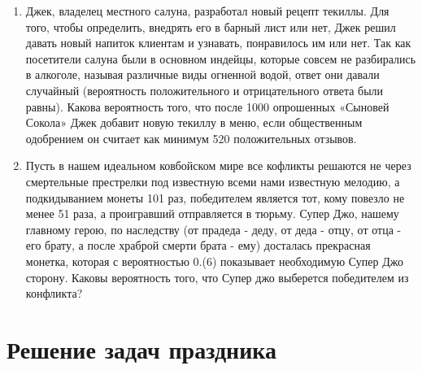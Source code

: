 \documentclass[11pt, a4paper]{article}
\theoremstyle{definition}
\begin{document}
\begin{enumerate}
\begin{enumerate}
    
    \item Джек, владелец местного салуна, разработал новый рецепт текиллы. Для того, чтобы определить, внедрять его в барный лист или нет, Джек решил давать новый напиток клиентам и узнавать, понравилось им или нет. Так как посетители салуна были в основном индейцы, которые совсем не разбирались в алкоголе, называя различные виды огненной водой, ответ они давали случайный (вероятность положительного и отрицательного ответа были равны). Какова вероятность того, что после 1000 опрошенных «Сыновей Сокола» Джек добавит новую текиллу в меню, если общественным одобрением он считает как минимум 520 положительных отзывов.
    
    
    \item Пусть в нашем идеальном ковбойском мире все кофликты решаются не через смертельные престрелки под известную всеми нами известную мелодию, а подкидыванием монеты 101 раз, победителем является тот, кому повезло не менее 51 раза, а проигравший отправляется в тюрьму. Супер Джо, нашему главному герою, по наследству (от прадеда - деду, от деда - отцу, от отца - его брату, а после храброй смерти брата - ему) досталась прекрасная монетка, которая с вероятностью 0.(6) показывает необходимую Супер Джо сторону. Каковы вероятность того, что Супер джо выберется победителем из конфликта?
    
    
    
\end{enumerate}    

\end{enumerate}
\section{Решение задач праздника}
\end{document}
